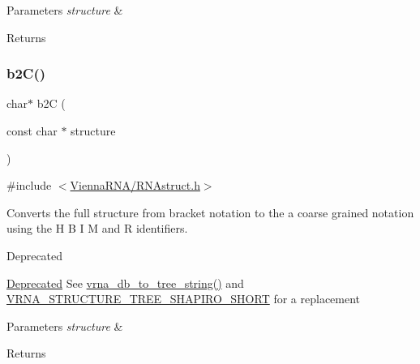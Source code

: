 \begin{DoxyParams}{Parameters}
{\em structure} & \\
\hline
\end{DoxyParams}
\begin{DoxyReturn}{Returns}

\end{DoxyReturn}
\mbox{\label{group__struct__utils__deprecated_ga9c80d92391f2833549a8b6dac92233f0}} 
\subsubsection{\texorpdfstring{b2\+C()}{b2C()}}
{\footnotesize\ttfamily char$\ast$ b2C (\begin{DoxyParamCaption}\item[{const char $\ast$}]{structure }\end{DoxyParamCaption})}



{\ttfamily \#include $<$\hyperlink{RNAstruct_8h}{Vienna\+R\+N\+A/\+R\+N\+Astruct.\+h}$>$}



Converts the full structure from bracket notation to the a coarse grained notation using the \textquotesingle{}H\textquotesingle{} \textquotesingle{}B\textquotesingle{} \textquotesingle{}I\textquotesingle{} \textquotesingle{}M\textquotesingle{} and \textquotesingle{}R\textquotesingle{} identifiers. 

\begin{DoxyRefDesc}{Deprecated}
\item[\hyperlink{deprecated__deprecated000127}{Deprecated}]See \hyperlink{group__struct__utils__tree_ga56551ab7da64933a7230d29430f40cfe}{vrna\+\_\+db\+\_\+to\+\_\+tree\+\_\+string()} and \hyperlink{group__struct__utils__tree_ga549e259a963d77e2d5b7e14083fc016e}{V\+R\+N\+A\+\_\+\+S\+T\+R\+U\+C\+T\+U\+R\+E\+\_\+\+T\+R\+E\+E\+\_\+\+S\+H\+A\+P\+I\+R\+O\+\_\+\+S\+H\+O\+RT} for a replacement\end{DoxyRefDesc}



\begin{DoxyParams}{Parameters}
{\em structure} & \\
\hline
\end{DoxyParams}
\begin{DoxyReturn}{Returns}

\end{DoxyReturn}
\mbox{\label{group__struct__utils__deprecated_ga5cd2feb367feeacad0c03cb7ddba5f10}} 

